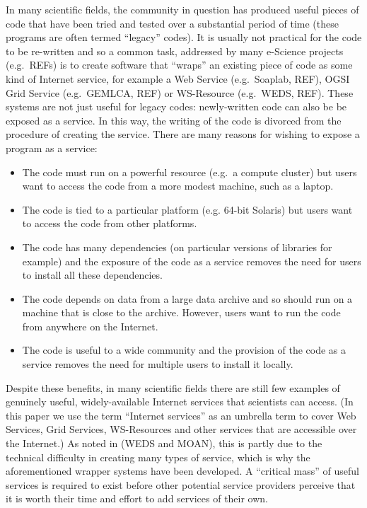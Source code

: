 \documentclass{llncs}
\begin{document}
In many scientific fields, the community in question has produced useful pieces of code that have been tried and tested over a substantial period of time (these programs are often termed ``legacy'' codes).  It is usually not practical for the code to be re-written and so a common task, addressed by many e-Science projects (e.g.\ REFs) is to create software that ``wraps'' an existing piece of code as some kind of Internet service, for example a Web Service (e.g.\ Soaplab, REF), OGSI Grid Service (e.g.\ GEMLCA, REF) or WS-Resource (e.g.\ WEDS, REF).  These systems are not just useful for legacy codes: newly-written code can also be be exposed as a service.  In this way, the writing of the code is divorced from the procedure of creating the service.  There are many reasons for wishing to expose a program as a service:
\begin{itemize}
	\item The code must run on a powerful resource (e.g.\ a compute cluster) but users want to access the code from a more modest machine, such as a laptop.
	\item The code is tied to a particular platform (e.g. 64-bit Solaris) but users want to access the code from other platforms.
	\item The code has many dependencies (on particular versions of libraries for example) and the exposure of the code as a service removes the need for users to install all these dependencies.
	\item The code depends on data from a large data archive and so should run on a machine that is close to the archive.  However, users want to run the code from anywhere on the Internet.
	\item The code is useful to a wide community and the provision of the code as a service removes the need for multiple users to install it locally.
\end{itemize}

Despite these benefits, in many scientific fields there are still few examples of genuinely useful, widely-available Internet services that scientists can access.  (In this paper we use the term ``Internet services'' as an umbrella term to cover Web Services, Grid Services, WS-Resources and other services that are accessible over the Internet.)  As noted in (WEDS and MOAN), this is partly due to the technical difficulty in creating many types of service, which is why the aforementioned wrapper systems have been developed.  A ``critical mass'' of useful services is required to exist before other potential service providers perceive that it is worth their time and effort to add services of their own.
\end{document}
